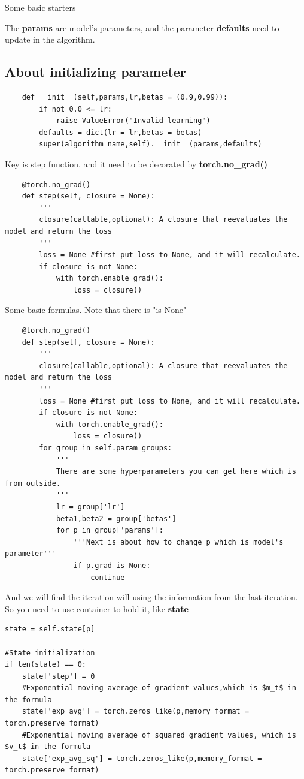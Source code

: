 \documentclass[11pt,en,bibstyle=ieeetr]{elegantpaper}
\begin{document}
Some basic starters

The \textbf{params} are model's parameters, and the parameter \textbf{defaults} need to update in the algorithm.
\subsection{About initializing parameter}
\begin{lstlisting}
	def __init__(self,params,lr,betas = (0.9,0.99)):
		if not 0.0 <= lr:
			raise ValueError("Invalid learning")
		defaults = dict(lr = lr,betas = betas)
		super(algorithm_name,self).__init__(params,defaults)
\end{lstlisting}

Key is step function, and it need to be decorated by \textbf{torch.no\_grad()}
\begin{lstlisting}
	@torch.no_grad()
	def step(self, closure = None):
		'''
		closure(callable,optional): A closure that reevaluates the model and return the loss
		'''
		loss = None #first put loss to None, and it will recalculate.
		if closure is not None:
			with torch.enable_grad():
				loss = closure()

\end{lstlisting}
Some basic formulas.
Note that there is "is None"
\begin{lstlisting}
	@torch.no_grad()
	def step(self, closure = None):
		'''
		closure(callable,optional): A closure that reevaluates the model and return the loss
		'''
		loss = None #first put loss to None, and it will recalculate.
		if closure is not None:
			with torch.enable_grad():
				loss = closure()
		for group in self.param_groups:
			'''
			There are some hyperparameters you can get here which is from outside.
			'''
			lr = group['lr']
			beta1,beta2 = group['betas']
			for p in group['params']:
				'''Next is about how to change p which is model's parameter'''
				if p.grad is None:
					continue
\end{lstlisting}

And we will find the iteration will using the information from the last iteration.
So you need to use container to hold it, like \textbf{state}

\begin{lstlisting}
state = self.state[p]

#State initialization
if len(state) == 0:
	state['step'] = 0
	#Exponential moving average of gradient values,which is $m_t$ in the formula 
	state['exp_avg'] = torch.zeros_like(p,memory_format = torch.preserve_format)
	#Exponential moving average of squared gradient values, which is $v_t$ in the formula
	state['exp_avg_sq'] = torch.zeros_like(p,memory_format = torch.preserve_format)

\end{lstlisting}
\end{document}
